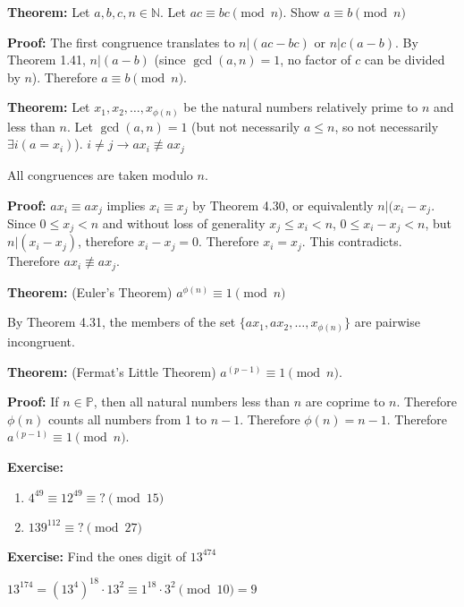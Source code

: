 \item \textbf{Theorem:} Let \(a, b, c, n \in \mathbb N\). Let \(ac \equiv bc \pmod n\). Show \(a \equiv b \pmod n\)

\textbf{Proof:} The first congruence translates to \(n | (ac-bc)\) or \(n | c(a-b)\). By Theorem 1.41, \(n | (a-b)\) (since \(\gcd(a, n) = 1\), no factor of \(c\) can be divided by \(n\)). Therefore \(a \equiv b \pmod n\). \qedhere

\item \textbf{Theorem:} Let \(x_1, x_2, \dots, x_{\phi(n)}\) be the natural numbers relatively prime to \(n\) and less than \(n\). Let \(\gcd(a, n) = 1\) (but not necessarily \(a \leq n\), so not necessarily \(\exists i (a = x_i)\)). \(i \neq j \rightarrow ax_i \not\equiv ax_j\)

All congruences are taken modulo \(n\).

\textbf{Proof:} \(ax_i \equiv ax_j\) implies \(x_i \equiv x_j\) by Theorem 4.30, or equivalently \(n|(x_i - x_j\). Since \(0 \leq x_j < n\) and without loss of generality \(x_j \leq x_i < n\), \(0 \leq x_i - x_j < n\), but \(n|(x_i - x_j)\), therefore \(x_i - x_j = 0\). Therefore \(x_i = x_j\). This contradicts. Therefore \(ax_i \not\equiv ax_j\). \qedhere

\item \textbf{Theorem:} (Euler's Theorem) \(a^{\phi(n)} \equiv 1 \pmod n\)

By Theorem 4.31, the members of the set \(\{ax_1, ax_2, \dots, x_{\phi(n)}\}\) are pairwise incongruent.

\item \textbf{Theorem:} (Fermat's Little Theorem) \(a^{(p-1)} \equiv 1 \pmod n\).

\textbf{Proof:} If \(n \in \mathbb P\), then all natural numbers less than \(n\) are coprime to \(n\). Therefore \(\phi(n)\) counts all numbers from 1 to \(n-1\). Therefore \(\phi(n) = n - 1\). Therefore \(a^{(p-1)} \equiv 1 \pmod n\). \qedhere

\item \textbf{Exercise:}
\begin{enumerate}
\item \(4^{49} \equiv 12^{49} \equiv ? \pmod{15}\)
\item \(139^{112} \equiv ? \pmod {27}\)
\end{enumerate}

\item \textbf{Exercise:} Find the ones digit of \(13^{474}\)

\(13^{174} = (13^4)^{18} \cdot 13^2 \equiv 1^{18} \cdot 3^2 \pmod {10} = 9\)

